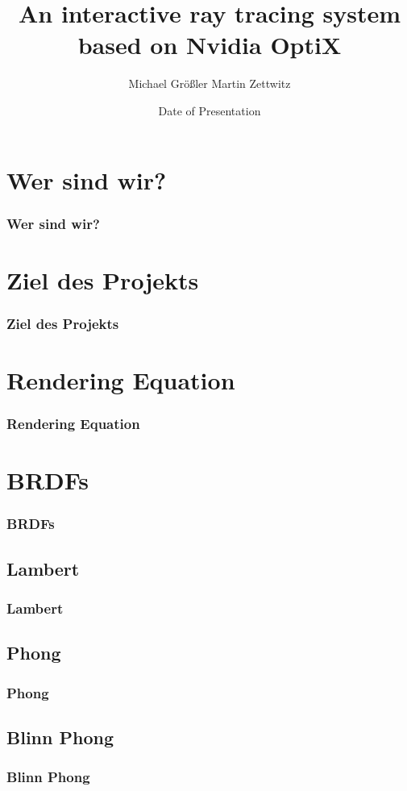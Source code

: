 \documentclass[11pt]{beamer}
\author{Michael Größler Martin Zettwitz}
\title{An interactive ray tracing system \\ based on Nvidia OptiX}
\date{Date of Presentation}
\begin{document}
\begin{frame}
\titlepage
\end{frame}

\begin{frame}
\tableofcontents
\end{frame}





\section{Wer sind wir?}
\begin{frame}
\frametitle{Wer sind wir?}
\end{frame}

\section{Ziel des Projekts}
\begin{frame}
\frametitle{Ziel des Projekts}
\end{frame}

\section{Rendering Equation}
\begin{frame}
\frametitle{Rendering Equation}

\end{frame}

\section{BRDFs}
\begin{frame}
\frametitle{BRDFs}
\end{frame}

\subsection{Lambert}
\begin{frame}
\frametitle{Lambert}
\end{frame}

\subsection{Phong}
\begin{frame}
\frametitle{Phong}
\end{frame}

\subsection{Blinn Phong}
\begin{frame}
\frametitle{Blinn Phong}
\end{frame}
\end{document}
